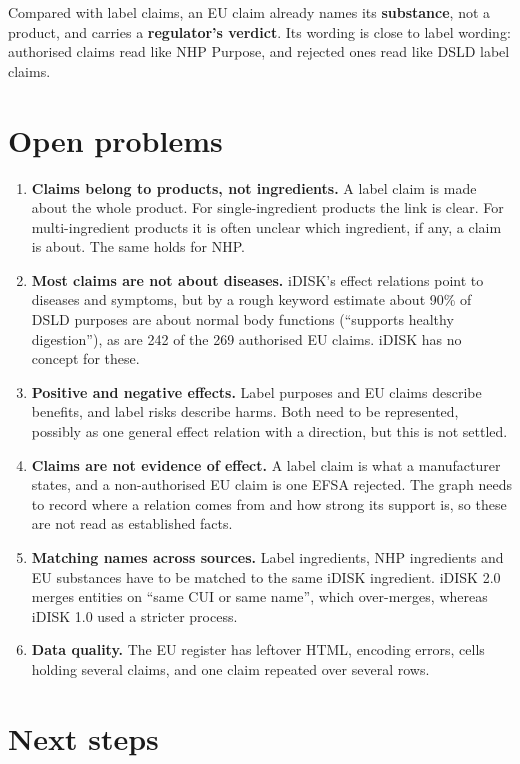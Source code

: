 \documentclass[10pt,a4paper]{article}
\begin{document}
Compared with label claims, an EU claim already names its \textbf{substance}, not a product, and
carries a \textbf{regulator's verdict}. Its wording is close to label wording: authorised claims read
like NHP Purpose, and rejected ones read like DSLD label claims.

\section{Open problems}

\begin{enumerate}
  \item \textbf{Claims belong to products, not ingredients.} A label claim is made about the whole
        product. For single-ingredient products the link is clear. For multi-ingredient products it is
        often unclear which ingredient, if any, a claim is about. The same holds for NHP.
  \item \textbf{Most claims are not about diseases.} iDISK's effect relations point to diseases and
        symptoms, but by a rough keyword estimate about 90\% of DSLD purposes are about normal body
        functions (``supports healthy digestion''), as are 242 of the 269 authorised EU claims. iDISK
        has no concept for these.
  \item \textbf{Positive and negative effects.} Label purposes and EU claims describe benefits, and
        label risks describe harms. Both need to be represented, possibly as one general effect
        relation with a direction, but this is not settled.
  \item \textbf{Claims are not evidence of effect.} A label claim is what a manufacturer states, and a
        non-authorised EU claim is one EFSA rejected. The graph needs to record where a relation comes
        from and how strong its support is, so these are not read as established facts.
  \item \textbf{Matching names across sources.} Label ingredients, NHP ingredients and EU substances
        have to be matched to the same iDISK ingredient. iDISK 2.0 merges entities on ``same CUI or
        same name'', which over-merges, whereas iDISK 1.0 used a stricter process.
  \item \textbf{Data quality.} The EU register has leftover HTML, encoding errors, cells holding
        several claims, and one claim repeated over several rows.
\end{enumerate}

\section{Next steps}
\end{document}
